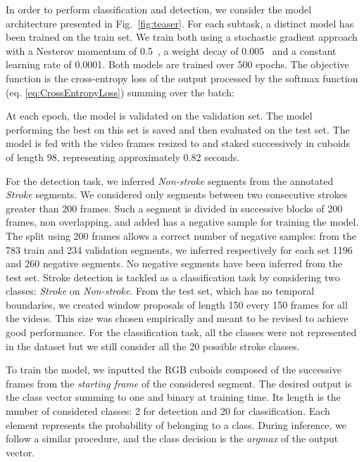 \documentclass[sigconf]{acmart-me}
\begin{document}
In order to perform classification and detection, we consider the model architecture presented in Fig.~\ref{fig:teaser}. For each subtask, a distinct model has been trained on the train set. We train both using a stochastic gradient approach with a Nesterov momentum of 0.5~\cite{Deep:Nesterov1}, a weight decay of 0.005~\citep{Deep:weight_decay} and a constant learning rate of 0.0001. Both models are trained over 500 epochs. The objective function is the cross-entropy loss of the output processed by the softmax function (eq. \ref{eq:CrossEntropyLoss}) summing over the batch:
\vspace{-2pt}


At each epoch, the model is validated on the validation set. The model performing the best on this set is saved and then evaluated on the test set. The model is fed with the video frames resized to  and staked successively in cuboids of length 98, representing approximately 0.82 seconds.
\par
For the detection task, we inferred \textit{Non-stroke} segments from the annotated \textit{Stroke} segments. We considered only segments between two consecutive strokes greater than 200 frames. Such a segment is divided in successive blocks of 200 frames, non overlapping, and added has a negative sample for training the model. The split using 200 frames allows a correct number of negative samples: from the 783 train and 234 validation segments, we inferred respectively for each set 1196 and 260 negative segments. No negative segments have been inferred from the test set. Stroke detection is tackled as a classification task by considering two classes: \textit{Stroke} on \textit{Non-stroke}. From the test set, which has no temporal boundaries, we created window proposals of length 150 every 150 frames for all the videos. This size was chosen empirically and meant to be revised to achieve good performance. For the classification task, all the classes were not represented in the dataset but we still consider all the 20 possible stroke classes.
\par
To train the model, we inputted the RGB cuboids composed of the successive frames from the \textit{starting frame} of the considered segment. The desired output is the class vector summing to one and binary at training time. Its length is the number of considered classes: 2 for detection and 20 for classification. Each element represents the probability of belonging to a class. During inference, we follow a similar procedure, and the class decision is the \textit{argmax} of the output vector.
\vspace{-7pt}
\end{document}

